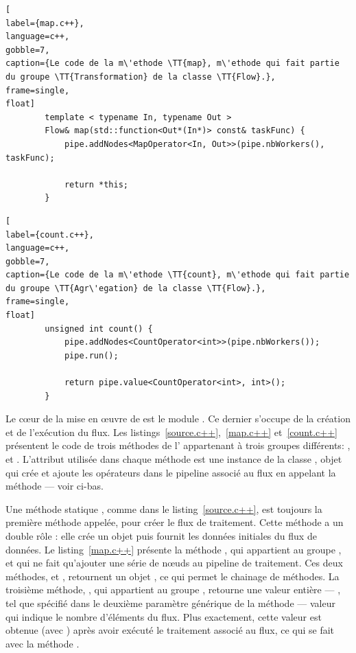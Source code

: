 \begin{lstlisting}[
label={map.c++},
language=c++,
gobble=7,
caption={Le code de la m\'ethode \TT{map}, m\'ethode qui fait partie du groupe \TT{Transformation} de la classe \TT{Flow}.},
frame=single,
float]
        template < typename In, typename Out >
        Flow& map(std::function<Out*(In*)> const& taskFunc) {
            pipe.addNodes<MapOperator<In, Out>>(pipe.nbWorkers(), taskFunc);

            return *this;
        }
\end{lstlisting}


\begin{lstlisting}[
label={count.c++},
language=c++,
gobble=7,
caption={Le code de la m\'ethode \TT{count}, m\'ethode qui fait partie du groupe \TT{Agr\'egation} de la classe \TT{Flow}.},
frame=single,
float]
        unsigned int count() {
            pipe.addNodes<CountOperator<int>>(pipe.nbWorkers());
            pipe.run();

            return pipe.value<CountOperator<int>, int>();
        }
\end{lstlisting}


Le c\oe{}ur de la mise en œuvre de  est le module . Ce dernier s'occupe de la cr\'eation et de l'ex\'ecution du flux. Les listings~\ref{source.c++},~\ref{map.c++} et~\ref{count.c++} pr\'esentent le code de trois m\'ethodes de l' appartenant \`a trois groupes diff\'erents: ,  et . L'attribut  utilisée dans chaque m\'ethode est une instance de la classe , objet qui cr\'ee et ajoute les op\'erateurs dans le pipeline associ\'e au flux en appelant la m\'ethode  --- voir ci-bas. 

Une m\'ethode statique , comme dans le listing~\ref{source.c++}, est toujours la premi\`ere m\'ethode appelée, pour créer le flux de traitement. Cette m\'ethode a un double r\^ole : elle cr\'ee un objet  puis fournit les donn\'ees initiales du flux de donn\'ees. Le listing~\ref{map.c++} pr\'esente la m\'ethode , qui appartient au groupe , et qui ne fait qu'ajouter une série de n\oe{}uds au pipeline de traitement. Ces deux m\'ethodes,  et , retournent un objet , ce qui permet le chainage de méthodes. La troisi\`eme m\'ethode, , qui appartient au groupe , retourne une valeur enti\`ere
---
, tel que sp\'ecifi\'e dans le deuxi\`eme param\`etre générique de la m\'ethode 
---
valeur qui indique le nombre d'\'el\'ements du flux. Plus exactement, cette valeur est obtenue (avec ) après avoir ex\'ecuté le traitement associé au flux, ce qui se fait avec la m\'ethode .

